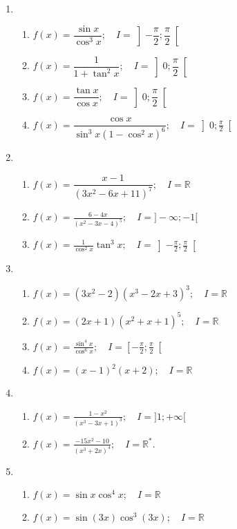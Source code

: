 \documentclass[12pt]{article}
\begin{document}
\begin{enumerate}
    \item 
    \begin{enumerate}
        \item $f(x) = \dfrac{\sin x}{\cos^3 x}; \quad I = \left]-\dfrac{\pi}{2}; \dfrac{\pi}{2}\right[$
        \item $f(x) = \dfrac{1}{1 + \tan^2 x}; \quad I = \left]0; \dfrac{\pi}{2}\right[$
        \item $f(x) = \dfrac{\tan x}{\cos x}; \quad I = \left]0; \dfrac{\pi}{2}\right[$
        \item $f(x) = \dfrac{\cos x}{\sin^3 x (1 - \cos^2 x)^6}; \quad I = \left]0; \frac{\pi}{2}\right[$
    \end{enumerate}
    \item 
    \begin{enumerate}
        \item $f(x) = \dfrac{x - 1}{(3x^2 - 6x + 11)^7}; \quad I = \mathbb{R}$
        \item \( f(x) = \frac{6 - 4x}{(x^2 - 3x - 4)^5}; \quad I = ]-\infty; -1[ \)
        \item \( f(x) = \frac{1}{\cos^2 x} \tan^3 x; \quad I = \left] - \frac{\pi}{2}; \frac{\pi}{2} \right[ \)
    \end{enumerate}
    \item
    \begin{enumerate}
    		\item \( f(x) = (3x^2 - 2) (x^3 - 2x + 3)^3; \quad I = \mathbb{R} \)
				\item \( f(x) = (2x + 1) (x^2 + x + 1)^5; \quad I = \mathbb{R} \)
    		\item \( f(x) = \frac{\sin^4 x}{\cos^6 x}; \quad I = \left[ - \frac{\pi}{2}; \frac{\pi}{2} \right[ \)
				\item \( f(x) = (x - 1)^2 (x + 2); \quad I = \mathbb{R} \)
    \end{enumerate}
    \item
    \begin{enumerate}
				\item \( f(x) = \frac{1 - x^2}{(x^3 - 3x + 1)^3}; \quad I = ]1; +\infty[ \)
 				\item \( f(x) = \frac{-15x^2 - 10}{(x^3 + 2x)^4}; \quad I = \mathbb{R}^* \).
		\end{enumerate}
		\item
		\begin{enumerate}
			\item \( f(x) = \sin x \cos^4 x; \quad I = \mathbb{R} \)
			\item \( f(x) = \sin(3x) \cos^3(3x); \quad I = \mathbb{R} \)

\end{enumerate}
\end{enumerate}
\end{document}
